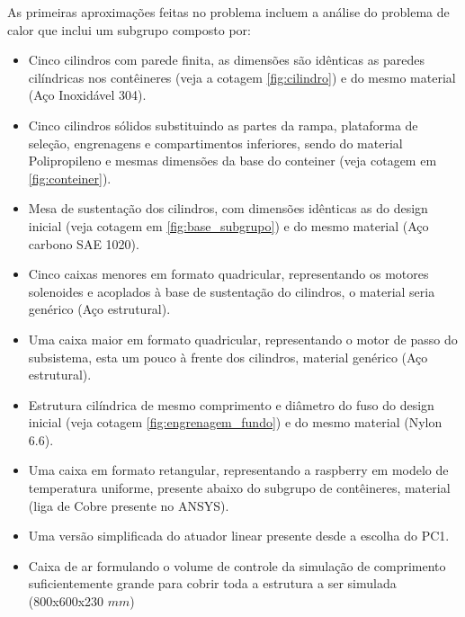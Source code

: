 As primeiras aproximações feitas no problema incluem a análise do problema de calor que inclui um subgrupo composto por:
\begin{itemize}
    \item Cinco cilindros com parede finita, as dimensões são idênticas as paredes cilíndricas nos contêineres (veja a cotagem \ref{fig:cilindro}) e do mesmo material (Aço Inoxidável 304).
    \item Cinco cilindros sólidos substituindo as partes da rampa, plataforma de seleção, engrenagens e compartimentos inferiores, sendo do material Polipropileno e mesmas dimensões da base do conteiner (veja cotagem em \ref{fig:conteiner}). 
    \item Mesa de sustentação dos cilindros, com dimensões idênticas as do design inicial (veja cotagem em \ref{fig:base_subgrupo}) e do mesmo material (Aço carbono SAE 1020).
    \item Cinco caixas menores em formato quadricular, representando os motores solenoides e acoplados à base de sustentação do cilindros, o material seria genérico (Aço estrutural).
    \item Uma caixa maior em formato quadricular, representando o motor de passo do subsistema, esta um pouco à frente dos cilindros, material genérico (Aço estrutural).
    \item Estrutura cilíndrica de mesmo comprimento e diâmetro do fuso do design inicial (veja cotagem \ref{fig:engrenagem_fundo}) e do mesmo material (Nylon 6.6).
    \item Uma caixa em formato retangular, representando a raspberry em modelo de temperatura uniforme, presente abaixo do subgrupo de contêineres, material (liga de Cobre presente no ANSYS).
    \item Uma versão simplificada do atuador linear presente desde a escolha do PC1.
    \item Caixa de ar formulando o volume de controle da simulação de comprimento suficientemente grande para cobrir toda a estrutura a ser simulada (800x600x230 $mm$)
\end{itemize}


